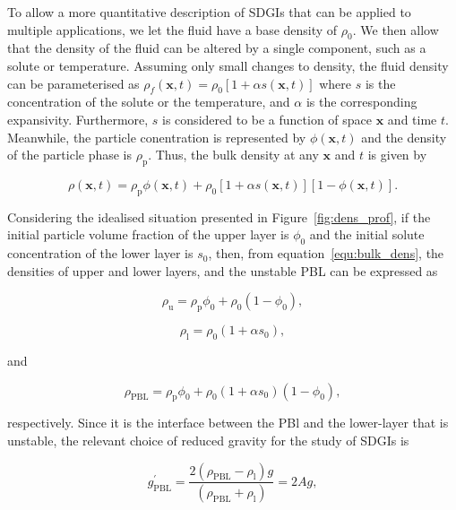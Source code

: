 \documentclass[authoryear,preprint,review,12pt]{elsarticle}
\begin{document}
To allow a more quantitative description of SDGIs that can be applied to multiple applications, we let the fluid have a base density of $\rho_{0}$. We then allow that the density of the fluid can be altered by a single component, such as a solute or temperature. Assuming only small changes to density, the fluid density can be parameterised as $\rho_{f}(\mathbf{x}, t) = \rho_{0} [1 + \alpha s(\mathbf{x}, t)]$ where $s$ is the concentration of the solute or the temperature, and $\alpha$ is the corresponding expansivity. Furthermore, $s$ is considered to be a function of space $\mathbf{x}$ and time $t$. Meanwhile, the particle conentration is represented by $\phi(\mathbf{x}, t)$ and the density of the particle phase is $\rho_{\text{p}}$. Thus, the bulk density at any $\mathbf{x}$ and $t$ is given by

\begin{equation}
  \label{equ:bulk_dens}
  \rho(\mathbf{x}, t) = \rho_{\text{p}} \phi(\mathbf{x}, t) + \rho_{0} [1 + \alpha s(\mathbf{x}, t)] [1 - \phi(\mathbf{x}, t)].
\end{equation}

Considering the idealised situation presented in Figure~\ref{fig:dens_prof}, if the initial particle volume fraction of the upper layer is $\phi_{0}$ and the initial solute concentration of the lower layer is $s_{0}$, then, from equation~\ref{equ:bulk_dens}, the densities of upper and lower layers, and the unstable PBL can be expressed as

\begin{equation}
  \label{equ:up_dens}
  \rho_{\text{u}} = \rho_{\text{p}} \phi_{0} + \rho_{0} (1 - \phi_{0}),
\end{equation}

\begin{equation}
  \label{equ:low_dens}
  \rho_{\text{l}} = \rho_{0} (1 + \alpha s_{0}),
\end{equation}

and

\begin{equation}
  \label{equ:PBL_dens}
  \rho_{\text{PBL}} = \rho_{\text{p}} \phi_{0} + \rho_{0} (1 + \alpha s_{0}) (1 - \phi_{0}),
\end{equation}

respectively. Since it is the interface between the PBl and the lower-layer that is unstable, the relevant choice of reduced gravity for the study of SDGIs is \citep{Davies_Wykes14}

\begin{equation}
  \label{equ:red_grav_PBL}
  g^{\prime}_{\text{PBL}} = \frac{2 (\rho_{\text{PBL}} - \rho_{\text{l}}) g}{(\rho_{\text{PBL}} + \rho_{\text{l}})} = 2 A g,
\end{equation}
\end{document}
